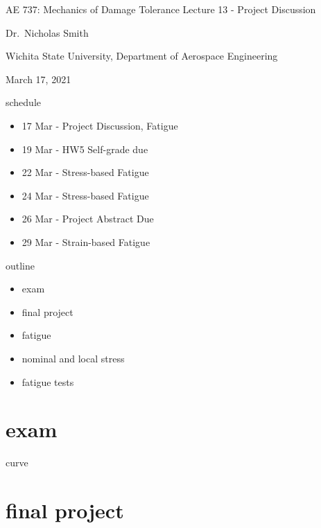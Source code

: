 \documentclass[
  letterpaper,
  ignorenonframetext,
  aspectratio=43,
  handout,
  12pt]{beamer}
\author{}
\date{}
\providecommand{\tightlist}{%
  \setlength{\itemsep}{0pt}\setlength{\parskip}{0pt}}
\providecommand{\tightlist}{%
\setlength{\itemsep}{0pt}\setlength{\parskip}{0pt}}
\begin{document}
\begin{frame}{AE 737: Mechanics of Damage Tolerance}
\protect\hypertarget{ae-737-mechanics-of-damage-tolerance}{}
Lecture 13 - Project Discussion

Dr.~Nicholas Smith

Wichita State University, Department of Aerospace Engineering

March 17, 2021
\end{frame}

\begin{frame}{schedule}
\protect\hypertarget{schedule}{}
\begin{itemize}
\tightlist
\item
  17 Mar - Project Discussion, Fatigue
\item
  19 Mar - HW5 Self-grade due
\item
  22 Mar - Stress-based Fatigue
\item
  24 Mar - Stress-based Fatigue
\item
  26 Mar - Project Abstract Due
\item
  29 Mar - Strain-based Fatigue
\end{itemize}
\end{frame}

\begin{frame}{outline}
\protect\hypertarget{outline}{}
\begin{itemize}
\tightlist
\item
  exam
\item
  final project
\item
  fatigue
\item
  nominal and local stress
\item
  fatigue tests
\end{itemize}
\end{frame}

\hypertarget{exam}{%
\section{exam}\label{exam}}

\begin{frame}{curve}
\protect\hypertarget{curve}{}
\end{frame}

\hypertarget{final-project}{%
\section{final project}\label{final-project}}
\end{document}
